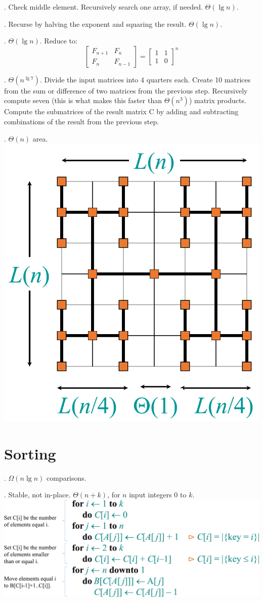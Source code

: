 \documentclass[fleqn]{slnotes}
\begin{document}
. Check middle element. Recursively search one array, if needed. \(\Theta(\lg n)\).

. Recurse by halving the exponent and squaring the result. \(\Theta(\lg n)\).

. \(\Theta(\lg n)\). Reduce to: \[
\begin{bmatrix}
F_{n+1} & F_n\\
F_n & F_{n-1}
\end{bmatrix}
=
\begin{bmatrix}
1&1\\1&0
\end{bmatrix}^n
\]

. \(\Theta(n^{\lg 7})\). Divide the input matrices into 4 quarters each. Create 10 matrices from the sum or difference of two matrices from the previous step. Recursively compute seven (this is what makes this faster than \(\Theta(n^3)\)) matrix products. Compute the submatrices of the result matrix C by adding and subtracting combinations of the result from the previous step.

. \(\Theta(n)\) area. \includegraphics[width=0.3\columnwidth]{htree-embedding.pdf}

\chapter{Sorting}
. \(\Omega(n \lg n)\) comparisons.

. Stable, not in-place. \(\Theta(n+k)\), for \(n\) input integers 0 to \(k\).\\\includegraphics[width=\columnwidth]{counting-sort.pdf}
\end{document}

